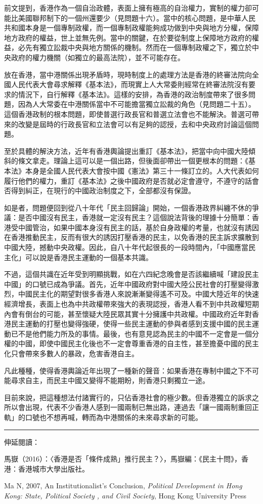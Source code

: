 前文提到，香港作為一個自治政體，表面上擁有極高的自治權力，實制的權力卻可能比美國聯邦制下的一個州還要少（見問題十六）。當中的核心問題，是中華人民共和國本身是一個專制政權，而一個專制政權能夠成功做到中央與地方分權，保障地方政府的權益，世上並無先例。當中的關鍵，在於要從制度上保障地方政府的權益，必先有獨立訟裁中央與地方關係的機制。然而在一個專制政權之下，獨立於中央政府的權力機關（如獨立的最高法院），並不可能存在。

放在香港，當中港關係出現矛盾時，現時制度上的處理方法是香港的終審法院向全國人民代表大會尋求解釋《基本法》，而現實上人大常委則經常在終審法院沒有要求的情況下，自行解釋《基本法》。這樣的安排，為香港的政治制度帶來了很多問題，因為人大常委在中港關係當中不可能擔當獨立訟裁的角色（見問題二十五）。這個香港政制的根本問題，即使普選行政長官和普選立法會也不能解決。普選可帶來的改變是屆時的行政長官和立法會可以有足夠的認授，去和中央政府討論這個問題。

至於具體的解決方法，近年有香港輿論提出重訂《基本法》，把當中向中國大陸傾斜的條文拿走。理論上這可以是一個出路，但後面卻帶出一個更根本的問題：《基本法》本身是全國人民代表大會按中國《憲法》第三十一條訂立的。人大代表如何履行他們的權力，重訂《基本法》之後中國政府是否就必定會遵守，不遵守的話會否得到糾正，在現行的中國政治制度之下，全部都沒有保證。

如是者，問題便回到從八十年代「民主回歸論」開始，一個香港政界糾纏不休的爭議：是否中國沒有民主，香港就一定沒有民主？這個說法背後的理據十分簡單：香港受中國管治，如果中國本身沒有民主的話，基於自身政權的考量，也就沒有誘因在香港推動民主，反而有很大的誘因打壓香港的民主，以免香港的民主訴求擴散到中國大陸，撼動中央政權。因此，自八十年代起很長的一段時間內，「中國應當民主化」可以說是香港民主運動的一個基本共識。

不過，這個共識在近年受到明顯挑戰，如在六四紀念晚會是否該繼續喊「建設民主中國」的口號已成為爭議。首先，近年中國政府對中國大陸公民社會的打壓變得激烈，中國民主化的期望對很多香港人來說漸漸變得遙不可及。中國大陸近年的快速經濟增長，表面上也為中共政權帶來強大的表現認授，香港人看不到中共政權短期內會有倒台的可能，甚至懷疑大陸民眾其實十分擁護中共政權。中國政府近年對香港民主運動的打壓也變得強硬，使得一些民主運動的參與者感到支援中國的民主運動已不是他們能力所及的事情。最後，也有意見認為民主的中國不一定會是一個分權的中國，即使中國民主化後也不一定會尊重香港的自主性，甚至擔憂中國的民主化只會帶來多數人的暴政，危害香港自主。

凡此種種，使得香港輿論近年出現了一種新的聲音：如果香港在專制中國之下不可能尋求自主，而民主中國又變得不能期盼，則香港只剩獨立一途。

目前來說，把這種想法付諸實行的，只佔香港社會的極少數。但香港獨立的訴求之所以會出現，代表不少香港人感到一國兩制已無出路，連過去「讓一國兩制重回正軌」的口號也不想再喊，轉而為中港關係的未來尋求新的可能。

\rule[-10pt]{15cm}{0.05em}

伸延閱讀：

馬嶽（2016）：〈香港是否「條件成熟」推行民主？〉，馬嶽編：《民主十問》，香港：香港城市大學出版社。

Ma N, 2007, An Institutionalist’s Conclusion, \textit{Political Development in Hong Kong: State, Political Society , and Civil Society}, Hong Kong University Press